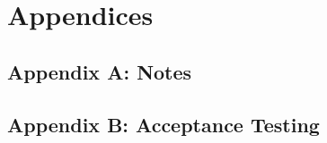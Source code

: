 \documentclass[12pt]{article}
\begin{document}
\section{Appendices}


\subsection{Appendix A: Notes}

\subsection{Appendix B: Acceptance Testing}
\end{document}
